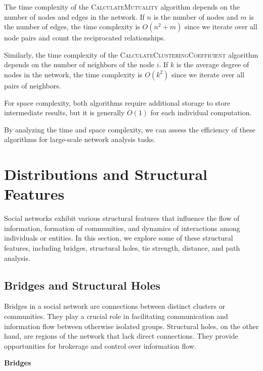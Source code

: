 \documentclass[12pt]{book} %
\begin{document}
The time complexity of the \textsc{CalculateMutuality} algorithm depends on the number of nodes and edges in the network. If \(n\) is the number of nodes and \(m\) is the number of edges, the time complexity is \(O(n^2 + m)\) since we iterate over all node pairs and count the reciprocated relationships.

Similarly, the time complexity of the \textsc{CalculateClusteringCoefficient} algorithm depends on the number of neighbors of the node \(i\). If \(k\) is the average degree of nodes in the network, the time complexity is \(O(k^2)\) since we iterate over all pairs of neighbors.

For space complexity, both algorithms require additional storage to store intermediate results, but it is generally \(O(1)\) for each individual computation.

By analyzing the time and space complexity, we can assess the efficiency of these algorithms for large-scale network analysis tasks.

\section{Distributions and Structural Features}

Social networks exhibit various structural features that influence the flow of information, formation of communities, and dynamics of interactions among individuals or entities. In this section, we explore some of these structural features, including bridges, structural holes, tie strength, distance, and path analysis.

\subsection{Bridges and Structural Holes}

Bridges in a social network are connections between distinct clusters or communities. They play a crucial role in facilitating communication and information flow between otherwise isolated groups. Structural holes, on the other hand, are regions of the network that lack direct connections. They provide opportunities for brokerage and control over information flow.

\textbf{Bridges}
\end{document}
